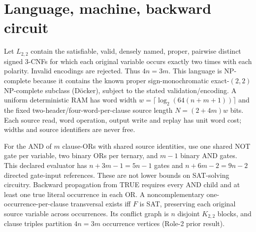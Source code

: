 \documentclass[11pt]{article}
\begin{document}
\section{Language, machine, backward circuit}
Let $L_{2,2}$ contain the satisfiable, valid, densely named, proper, pairwise distinct signed 3-CNFs for which each original variable occurs exactly two times with each polarity. Invalid encodings are rejected. Thus $4n=3m$. This language is NP-complete because it contains the known proper sign-monochromatic exact-$(2,2)$ NP-complete subclass (D\"ocker), subject to the stated validation/encoding. A uniform deterministic RAM has word width $w=\lceil\log_2(64(n+m+1))\rceil$ and the fixed two-header/four-word-per-clause source length $N=(2+4m)w$ bits. Each source read, word operation, output write and replay has unit word cost; widths and source identifiers are never free.
\par\noindent For the AND of $m$ clause-ORs with shared source identities, use one shared NOT gate per variable, two binary ORs per ternary, and $m-1$ binary AND gates. This declared evaluator has $n+3m-1=5n-1$ gates and $n+6m-2=9n-2$ directed gate-input references. These are not lower bounds on SAT-solving circuitry. Backward propagation from TRUE requires every AND child and at least one true literal occurrence in each OR. A noncomplementary one-occurrence-per-clause transversal exists iff $F$ is SAT, preserving each original source variable across occurrences. Its conflict graph is $n$ disjoint $K_{2,2}$ blocks, and clause triples partition $4n=3m$ occurrence vertices (Role-2 prior result).
\end{document}
